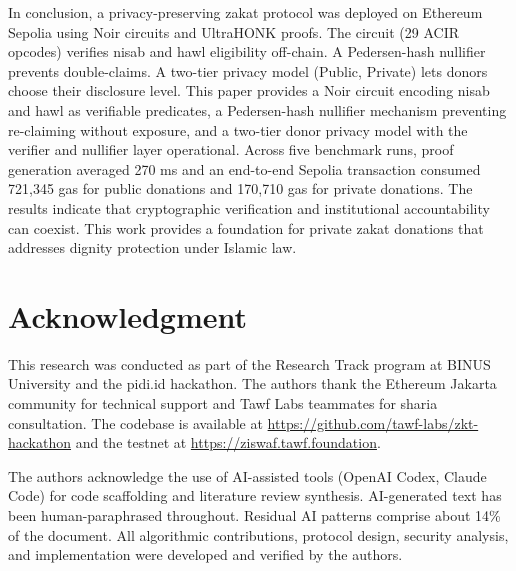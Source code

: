 \documentclass[conference]{IEEEtran}
\begin{document}
In conclusion, a privacy-preserving zakat protocol was deployed on Ethereum Sepolia using Noir circuits and UltraHONK proofs\cite{b_noir}\cite{b_aztec}. The circuit (29 ACIR opcodes) verifies nisab and hawl eligibility off-chain\cite{b_noir}. A Pedersen-hash nullifier prevents double-claims\cite{b_aztec}\cite{b_poseidon}. A two-tier privacy model (Public, Private) lets donors choose their disclosure level\cite{b_zkfi}\cite{b_zkp_financial}. This paper provides a Noir circuit encoding nisab and hawl as verifiable predicates\cite{b_noir}, a Pedersen-hash nullifier mechanism preventing re-claiming without exposure\cite{b_aztec}\cite{b_poseidon}, and a two-tier donor privacy model with the verifier and nullifier layer operational\cite{b_zkfi}. Across five benchmark runs, proof generation averaged 270 ms and an end-to-end Sepolia transaction consumed 721,345 gas for public donations and 170,710 gas for private donations\cite{b_aztec}\cite{b_zkp_financial}. The results indicate that cryptographic verification and institutional accountability can coexist\cite{b_zkfi}\cite{b_maqasid_data}. This work provides a foundation for private zakat donations that addresses dignity protection under Islamic law\cite{b_maqasid_privacy}\cite{b_maqasid_blockchain}.

\section*{Acknowledgment}

This research was conducted as part of the Research Track program at BINUS University and the pidi.id hackathon. The authors thank the Ethereum Jakarta community for technical support and Tawf Labs teammates for sharia consultation. The codebase is available at \url{https://github.com/tawf-labs/zkt-hackathon} and the testnet at \url{https://ziswaf.tawf.foundation}.

The authors acknowledge the use of AI-assisted tools (OpenAI Codex, Claude Code) for code scaffolding and literature review synthesis. AI-generated text has been human-paraphrased throughout. Residual AI patterns comprise about 14\% of the document. All algorithmic contributions, protocol design, security analysis, and implementation were developed and verified by the authors.
\end{document}
